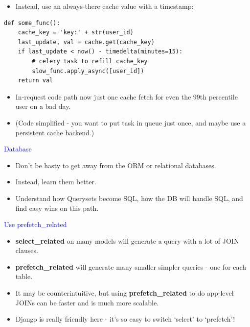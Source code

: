 \documentclass[landscape]{slides}
\begin{document}
\begin{slide}

    \begin{itemize}
        \item Instead, use an always-there cache value with a timestamp:
    \end{itemize}

    \begin{lstlisting}
def some_func():
    cache_key = 'key:' + str(user_id)
    last_update, val = cache.get(cache_key)
    if last_update < now() - timedelta(minutes=15):
        # celery task to refill cache_key
        slow_func.apply_async([user_id])
    return val
    \end{lstlisting}

    \begin{itemize}
        \item In-request code path now just one cache fetch for even the 99th percentile user on a bad day.
        \item (Code simplified - you want to put task in queue just once, and maybe use a persistent cache backend.)
    \end{itemize}

\end{slide}


\begin{slide}

    \textcolor{blue}{\Large{Database}}

    \begin{itemize}
        \item Don't be hasty to get away from the ORM or relational databases.
        \item Instead, learn them better.
        \item Understand how Querysets become SQL, how the DB will handle SQL, and find easy wins on this path.
    \end{itemize}

\end{slide}


\begin{slide}

    \textcolor{blue}{\Large{Use prefetch\_related}}

    \begin{itemize}
        \item \textbf{select\_related} on many models will generate a query with a lot of JOIN clauses.
        \item \textbf{prefetch\_related} will generate many smaller simpler queries - one for each table.
        \item It may be counterintuitive, but using \textbf{prefetch\_related} to do app-level JOINs can be faster and is much more scalable.
        \item Django is really friendly here - it's so easy to switch `select' to `prefetch'!
    \end{itemize}

\end{slide}
\end{document}
